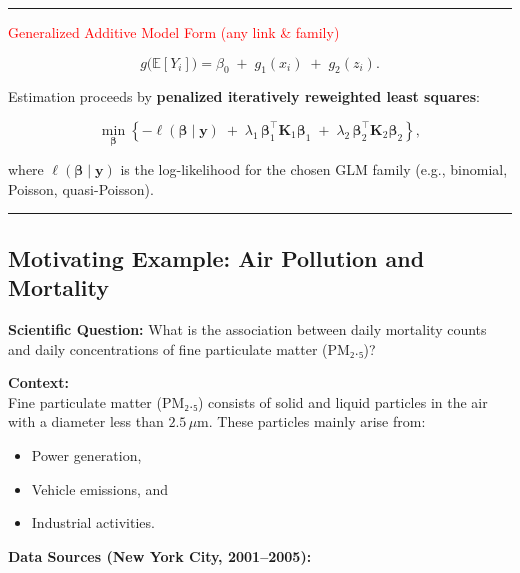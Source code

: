\documentclass[
  letterpaper,
  DIV=11,
  numbers=noendperiod]{scrreprt}
\providecommand{\tightlist}{%
  \setlength{\itemsep}{0pt}\setlength{\parskip}{0pt}}\usepackage{longtable,booktabs,array}
\begin{document}
\begin{center}\rule{0.5\linewidth}{0.5pt}\end{center}

\textcolor{red}{Generalized Additive Model Form (any link & family)}

\[
g\!\big(\mathbb{E}[Y_i]\big)
=
\beta_0
\;+\;
g_1(x_i)
\;+\;
g_2(z_i).
\]

Estimation proceeds by \textbf{penalized iteratively reweighted least
squares}:

\[
\min_{\boldsymbol{\beta}}
\left\{
-\ell(\boldsymbol{\beta}\mid \mathbf{y})
\;+\;
\lambda_1\, \boldsymbol{\beta}_1^\top \mathbf{K}_1 \boldsymbol{\beta}_1
\;+\;
\lambda_2\, \boldsymbol{\beta}_2^\top \mathbf{K}_2 \boldsymbol{\beta}_2
\right\},
\]

where \(\ell(\boldsymbol{\beta}\mid \mathbf{y})\) is the log-likelihood
for the chosen GLM family (e.g., binomial, Poisson, quasi-Poisson).

\begin{center}\rule{0.5\linewidth}{0.5pt}\end{center}

\hypertarget{motivating-example-air-pollution-and-mortality}{%
\subsection*{Motivating Example: Air Pollution and
Mortality}\label{motivating-example-air-pollution-and-mortality}}

\textbf{Scientific Question:} What is the association between daily
mortality counts and daily concentrations of fine particulate matter
(PM₂.₅)?

\textbf{Context:}\\
Fine particulate matter (PM₂.₅) consists of solid and liquid particles
in the air with a diameter less than \(2.5\,\mu\text{m}\). These
particles mainly arise from:

\begin{itemize}
\tightlist
\item
  Power generation,\\
\item
  Vehicle emissions, and\\
\item
  Industrial activities.
\end{itemize}

\textbf{Data Sources (New York City, 2001--2005):}
\end{document}
